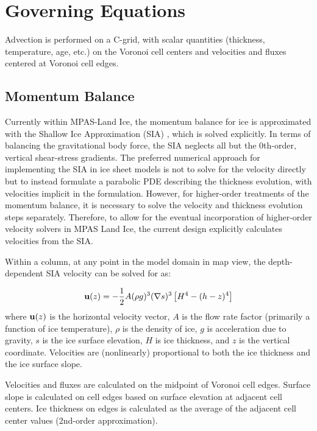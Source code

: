 \chapter{Governing Equations}
\label{chap:landice-intro}



Advection is performed on a C-grid, with scalar quantities (thickness, temperature, age, etc.) on the Voronoi cell centers and velocities and fluxes centered at Voronoi cell edges.

\section{Momentum Balance}

Currently within MPAS-Land Ice, the momentum balance for ice is approximated with the Shallow Ice Approximation (SIA) \citep{Hutter1983}, which is solved explicitly.  In terms of balancing the gravitational body force, the SIA neglects all but the 0th-order, vertical shear-stress gradients.  The preferred numerical approach for implementing the SIA in ice sheet models is not to solve for the velocity directly but to instead formulate a parabolic PDE describing the thickness evolution, with velocities implicit in the formulation.  However, for higher-order treatments of the momentum balance, it is necessary to solve the velocity and thickness evolution steps separately. Therefore, to allow for the eventual incorporation of higher-order velocity solvers in MPAS Land Ice, the current design explicitly calculates velocities from the SIA.

Within a column, at any point in the model domain in map view, the depth-dependent SIA velocity can be solved for as:

\begin{equation}
    \label{sia}
	\mathbf{u}(z) = -\frac{1}{2} A (\rho g )^3 (\nabla s)^3 \left[H^4 - (h-z)^4 \right]
\end{equation}
where $\mathbf{u}(z)$ is the horizontal velocity vector, $A$ is the flow rate factor (primarily a function of ice temperature), $\rho$ is the density of ice, $g$ is acceleration due to gravity, $s$ is the ice surface elevation, $H$ is ice thickness, and $z$ is the vertical coordinate. Velocities are (nonlinearly) proportional to both the ice thickness and the ice surface slope.

Velocities and fluxes are calculated on the midpoint of Voronoi cell edges.  Surface slope is calculated on cell edges based on surface elevation at adjacent cell centers.  Ice thickness on edges is calculated as the average of the adjacent cell center values (2nd-order approximation).


